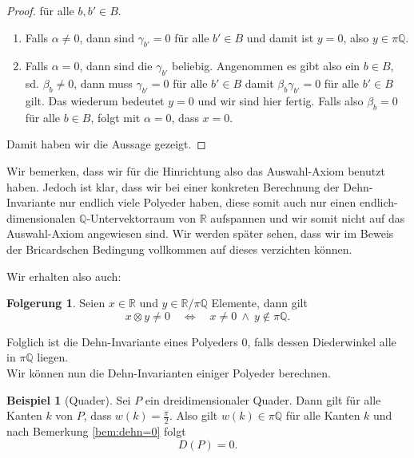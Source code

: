\documentclass[11pt,titlepage]{article}
\newcommand{\setQ}{\mathbb{Q}}
\newcommand{\setR}{\mathbb{R}}
\theoremstyle{definition}
\newtheorem{corollary}[theorem]{Folgerung}
\newtheorem{example}[theorem]{Beispiel}
\theoremstyle{remark}
\begin{document}
\begin{proof}
		für alle $b,b'\in B$. 
		\begin{enumerate}
			\item Falls $\alpha\neq 0$, dann sind $\gamma_{b'}=0$ für alle 
			$b'\in B$ und damit ist $y=0$, also $y\in \pi\setQ$.
			\item Falls $\alpha=0$, dann sind die $\gamma_{b'}$ beliebig. 
			Angenommen es gibt also ein $b\in B$, sd. $\beta_b \neq 0$, dann 
			muss $\gamma_{b'}=0$ für alle $b'\in B$ damit $\beta_b\gamma_{b'}=0$ 
			für alle $b'\in B$ gilt. Das wiederum bedeutet $y=0$ und wir sind hier 
			fertig. Falls also $\beta_b=0$ für alle $b\in B$, folgt mit $\alpha=0$, 
			dass $x=0$.
		\end{enumerate}
		Damit haben wir die Aussage gezeigt.
	\end{proof}

	Wir bemerken, dass wir für die Hinrichtung also das Auswahl-Axiom 
	benutzt haben. Jedoch ist klar, dass wir bei einer konkreten Berechnung der 
	Dehn-Invariante nur endlich viele Polyeder haben, diese somit auch 
	nur einen endlich-dimensionalen $\setQ$-Untervektorraum von $\setR$ aufspannen und wir somit nicht auf das Auswahl-Axiom angewiesen sind. Wir 
	werden später sehen, dass wir im Beweis der Bricardschen Bedingung 
	vollkommen auf dieses verzichten können.
	
	Wir erhalten also auch:
	
	\begin{corollary}
		Seien $x\in\setR$ und $y\in\setR/\pi\setQ$ Elemente, dann gilt
		\[ x\otimes y\neq0\quad\Leftrightarrow\quad x\neq 0 \ \land\ y\notin\pi\setQ. \]
	\end{corollary}
	
	Folglich ist die Dehn-Invariante eines Polyeders $0$, falls dessen Diederwinkel alle in $\pi\setQ$ liegen. \\
	
	Wir können nun die Dehn-Invarianten einiger Polyeder berechnen.
	
	\begin{example}[Quader] \label{exp:quader}
		Sei $P$ ein dreidimensionaler Quader. Dann gilt für alle Kanten $k$ von $P$, dass $w(k)=\frac{\pi}{2}$. 
		Also gilt $w(k)\in \pi\setQ$ für alle Kanten $k$ und nach Bemerkung \ref{bem:dehn=0} folgt
		\[ D(P)=0. \]
	\end{example}
	
\end{document}
